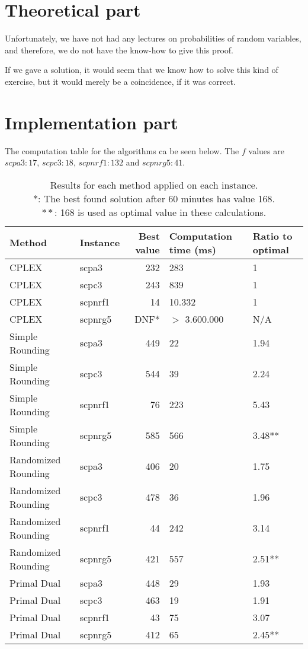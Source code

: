 \section{Theoretical part}
Unfortunately, we have not had any lectures on probabilities of random variables, and therefore, we do not have the know-how to give this proof.

\newpar If we gave a solution, it would seem that we know how to solve this kind of exercise, but it would merely be a coincidence, if it was correct.

\section{Implementation part}
The computation table for the algorithms ca be seen below. The $f$ values are $scpa3: 17$, $scpc3: 18$, $scpnrf1: 132$ and $scpnrg5: 41$.

\begin{table}[H]
	\centering
	\begin{tabularx}{\linewidth}{|X|l|r|X|X|}
		\hline
		\textbf{Method} & \textbf{Instance} & \textbf{Best value} & \textbf{Computation time (ms)} & \textbf{Ratio to optimal}\\\hline
		CPLEX & scpa3 & 232 & 283 & 1\\\hline
		CPLEX & scpc3 & 243 & 839 & 1\\\hline
		CPLEX & scpnrf1 & 14 & 10.332 & 1\\\hline
		CPLEX & scpnrg5 & DNF* & $>$ 3.600.000 & N/A\\\hline\hline
		Simple Rounding & scpa3 & 449 & 22 & 1.94\\\hline
		Simple Rounding & scpc3 & 544 & 39 & 2.24\\\hline
		Simple Rounding & scpnrf1 & 76 & 223 & 5.43\\\hline
		Simple Rounding & scpnrg5 & 585 & 566 & 3.48**\\\hline\hline
		Randomized Rounding & scpa3 & 406 & 20 & 1.75\\\hline
		Randomized Rounding & scpc3 & 478 & 36 & 1.96\\\hline
		Randomized Rounding & scpnrf1 & 44 & 242 & 3.14\\\hline
		Randomized Rounding & scpnrg5 & 421 & 557 & 2.51**\\\hline\hline
		Primal Dual & scpa3 & 448 & 29 & 1.93\\\hline
		Primal Dual & scpc3 & 463 & 19 & 1.91\\\hline
		Primal Dual & scpnrf1 & 43 & 75 & 3.07\\\hline
		Primal Dual & scpnrg5 & 412 & 65 & 2.45**\\\hline
	\end{tabularx}
	\caption{Results for each method applied on each instance.\\ $*$: The best found solution after 60 minutes has value 168.\\ $**$: 168 is used as optimal value in these calculations.}
\end{table}

